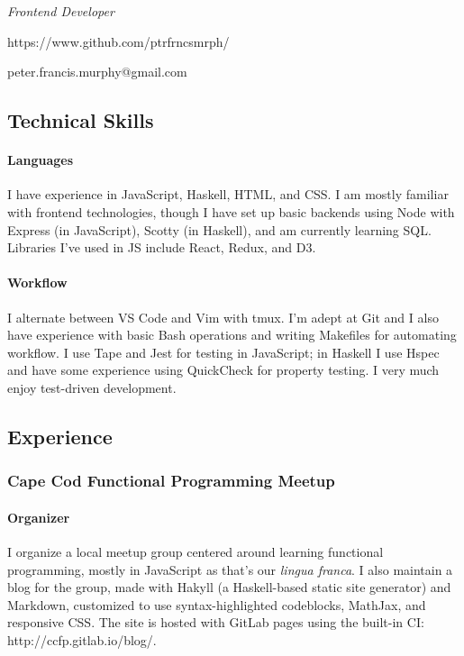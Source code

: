 \documentclass{article}
\author{Peter Murphy}
\makeatletter
\renewcommand{\maketitle}{
  \begin{minipage}[]{.5\textwidth}
    \par{\Huge\sffamily{\theauthor}\par}
  \end{minipage}
  \begin{minipage}[t]{.5\textwidth}
    \emph{Frontend Developer}

    https://www.github.com/ptrfrncsmrph/
    
    peter.francis.murphy@gmail.com
  \end{minipage}
}
\makeatother
\begin{document}
\maketitle

\subsection{Technical Skills}

\paragraph{Languages}

I have experience in JavaScript, Haskell, HTML, and CSS. I am mostly
familiar with frontend technologies, though I have set up basic backends
using Node with Express (in JavaScript), Scotty (in Haskell), and am
currently learning SQL. Libraries I've used in JS include React, Redux,
and D3.

\paragraph{Workflow}

I alternate between VS Code and Vim with tmux. I'm adept at Git and I
also have experience with basic Bash operations and writing Makefiles
for automating workflow. I use Tape and Jest for testing in JavaScript;
in Haskell I use Hspec and have some experience using QuickCheck for
property testing. I very much enjoy test-driven development.

\subsection{Experience}

\subsubsection{Cape Cod Functional Programming
Meetup}

\paragraph{Organizer}

I organize a local meetup group centered around learning functional
programming, mostly in JavaScript as that's our \emph{lingua franca}. I
also maintain a blog for the group, made with Hakyll (a Haskell-based
static site generator) and Markdown, customized to use syntax-highlighted
codeblocks, MathJax, and responsive CSS. The site is hosted with GitLab
pages using the built-in CI: http://ccfp.gitlab.io/blog/.
\end{document}
